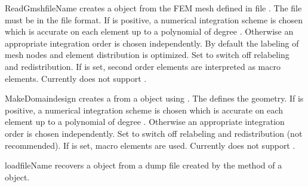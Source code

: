 \begin{funcdesc}{ReadGmsh}{fileName }
creates a \Domain object from the FEM mesh defined in file .
The file must be in the \gmshextern file format.
If  is positive, a numerical integration scheme is chosen
which is accurate on each element up to a polynomial of degree
.
Otherwise an appropriate integration order is chosen independently.
By default the labeling of mesh nodes and element distribution is optimized.
Set  to switch off relabeling and redistribution.
If  is set, second order elements are interpreted as
macro elements.
Currently  does not support \MPI.
\end{funcdesc}

\begin{funcdesc}{MakeDomain}{design}
creates a \finley \Domain from a \pycad {} object using \gmshextern.
The   defines the geometry.
If  is positive, a numerical integration scheme is chosen
which is accurate on each element up to a polynomial of degree
.
Otherwise an appropriate integration order is chosen independently.
Set  to switch off relabeling and redistribution
(not recommended).
If  is set, macro elements are used.
Currently  does not support \MPI.
\end{funcdesc}

\begin{funcdesc}{load}{fileName}
recovers a \Domain object from a dump file  created by the
 method of a \Domain object.
\end{funcdesc}

